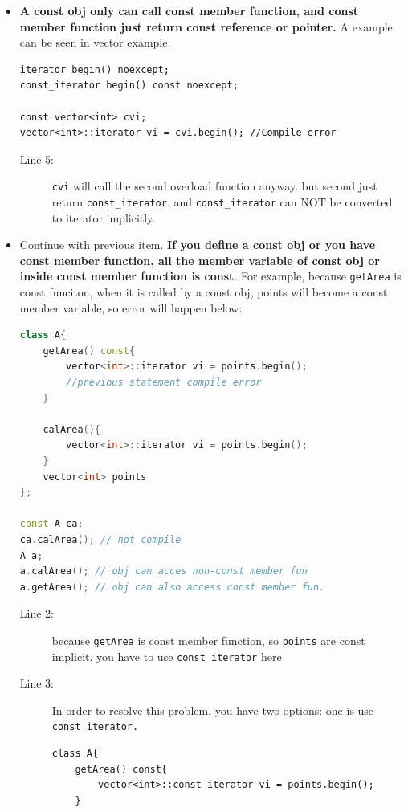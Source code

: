 \documentclass[a4paper,11pt,twoside]{book}
\begin{document}
\begin{itemize}
	
	
	
	\item \textbf{A const obj only can call const member function, and const member function just return const reference or pointer.} A example can be seen in vector example.  
	
\begin{lstlisting}
iterator begin() noexcept;
const_iterator begin() const noexcept;

const vector<int> cvi;
vector<int>::iterator vi = cvi.begin(); //Compile error
\end{lstlisting}
	\begin{description}
		\item[Line 5:] \texttt{cvi} will call the second overload function anyway. but second just return \texttt{const\_iterator}. and \texttt{const\_iterator} can NOT be converted to iterator implicitly.
	\end{description}
	
	\item Continue with previous item.\textbf{ If you define a const obj or you have const member function, all the member variable of const obj or inside const member function is const}. For example, because \texttt{getArea} is const funciton, when it is called by a const obj, points will become a const member variable, so error will happen below: 
	
\begin{lstlisting}[frame=single, language=c++]
class A{
	getArea() const{
		vector<int>::iterator vi = points.begin();
		//previous statement compile error
	}
	
	calArea(){
		vector<int>::iterator vi = points.begin();
	}
	vector<int> points
};

const A ca;
ca.calArea(); // not compile	
A a;
a.calArea(); // obj can acces non-const member fun
a.getArea(); // obj can also access const member fun.
\end{lstlisting}
	
	\begin{description}
		\item[Line 2:] because \texttt{getArea} is const member function, so \texttt{points} are const implicit. you have to use \texttt{const\_iterator} here
		
		\item[Line 3:] In order to resolve this problem, you have two options: one is use \texttt{const\_iterator.} 
\begin{lstlisting}[numbers=none]
class A{
	getArea() const{
		vector<int>::const_iterator vi = points.begin();
    }
\end{lstlisting}
			

\end{description}
\end{itemize}
\end{document}

